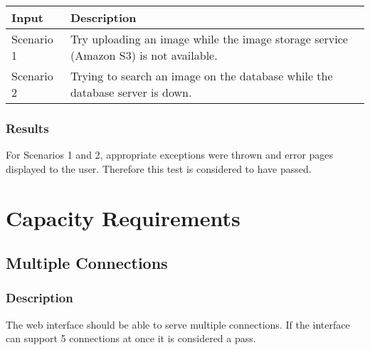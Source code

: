 \documentclass{scrreprt}
\begin{document}
\begin{table}[H]
        \centering
        \begin{tabular}{p{3cm}p{6cm}}
                \hline\hline
                Input & Description\\
                \hline\hline
                Scenario 1 &  Try uploading an image while the image storage service (Amazon S3) is not available. \\
                \hline
                Scenario 2 & Trying to search an image on the database while the database server is down. \\
                \hline
        \end{tabular}
\end{table}

\subsubsection{Results}

For Scenarios 1 and 2, appropriate exceptions were thrown and error pages
displayed to the user. Therefore this test is considered to have passed.

\section{Capacity Requirements}

\subsection{Multiple Connections}
\subsubsection{Description}

The web interface should be able to serve multiple connections. If the
interface can support 5 connections at once it is considered a pass.
\end{document}
